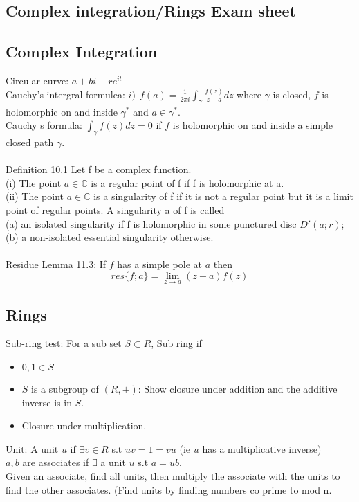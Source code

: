 \documentclass[1pt]{article}
\begin{document}
\begin{center}
\section*{Complex integration/Rings Exam sheet}
\end{center}
\small
\subsection*{Complex Integration}

Circular curve: $a+bi+re^{it}$
\\Cauchy's intergral formulea: $i) \ \ f(a)=\frac{1}{2\pi i}\int_{\gamma}\frac{f(z)}{z-a}dz$ where $\gamma$ is closed, $f$ is holomorphic on and inside $\gamma^*$ and $a\in \gamma^*$.
\\ Cauchy s formula: $\int_{\gamma} f(z)dz=0$ if $f$ is holomorphic on and inside a simple closed path $\gamma$.
\\
\\ Definition 10.1 Let f be a complex function.
\\(i) The point $a \in \mathbb{C}$ is a regular point of f if f is holomorphic at a.
\\(ii) The point $a \in \mathbb{C}$ is a singularity of f if it is not a regular point but it is a limit
point of regular points. A singularity a of f is called
\\(a) an isolated singularity if f is holomorphic in some punctured disc $D'
(a; r)$;
\\(b) a non-isolated essential singularity otherwise.
\\
\\Residue Lemma 11.3: If $f$ has a simple pole at $a$ then $$res\{f;a\}=\lim_{z\rightarrow a}(z-a)f(z)$$

\subsection*{Rings}
Sub-ring test: For a sub set $S\subset R$, Sub ring if
\begin{itemize}
\item $0,1\in S$
\item $S$ is a subgroup of $(R,+)$: Show closure under addition and the additive inverse is in $S$.
\item Closure under multiplication.
\end{itemize} 
Unit: A unit $u$ if $\exists v \in R$ s.t $uv=1=vu$ (ie $u$ has a multiplicative inverse)
\\ $a,b$ are associates if $\exists$ a unit $u$ s.t $a=ub$.
\\ Given an associate, find all units, then multiply the associate with the units to find the other associates. (Find units by finding numbers co prime to mod n.
\end{document}

